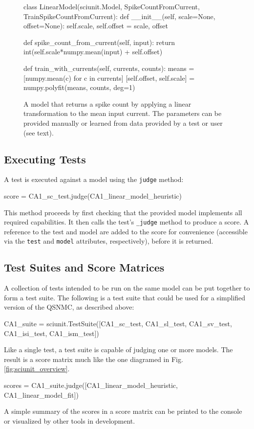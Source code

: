 \documentclass{frontiersSCNS}
\let\verbx\lstinline
\begin{document}
\begin{figure}
\begin{python}
class LinearModel(sciunit.Model, SpikeCountFromCurrent, 
    TrainSpikeCountFromCurrent):
  def __init__(self, scale=None, offset=None): 
    self.scale, self.offset = scale, offset
    
  def spike_count_from_current(self, input):
    return int(self.scale*numpy.mean(input) + self.offset)

  def train_with_currents(self, currents, counts):
    means = [numpy.mean(c) for c in currents]
    [self.offset, self.scale] = numpy.polyfit(means, counts, deg=1)    
\end{python}
\vspace{-15px}
\caption{A model that returns a spike count by applying a linear transformation to the mean input current. The parameters can be provided manually or learned from data provided by a test or user (see text).}
\label{fig:simple_model}
\vspace{-10px}
\end{figure}

\subsection{Executing Tests} A test is executed against a model using the \verbx{judge} method:
\begin{python}
score = CA1_sc_test.judge(CA1_linear_model_heuristic)
\end{python}

This method proceeds by first checking that the provided model implements all required capabilities. It then calls the test's \verbx{_judge} method to produce a score. A reference to the test and model are added to the score for convenience (accessible via the \verbx{test} and \verbx{model} attributes, respectively), before it is returned.

\subsection{Test Suites and Score Matrices} A collection of tests intended to be run on the same model can be put together to form a test suite.
The following is a test suite that could be used for a simplified version of the QSNMC, as described above:  
\begin{python}
CA1_suite = sciunit.TestSuite([CA1_sc_test, CA1_sl_test, CA1_sv_test, CA1_isi_test, CA1_ism_test])
\end{python}
Like a single test, a test suite is capable of judging one or more models. The result is a score matrix much like the one diagramed in Fig. \ref{fig:sciunit_overview}.
\begin{python}
scores = CA1_suite.judge([CA1_linear_model_heuristic, CA1_linear_model_fit])
\end{python}
A simple summary of the scores in a score matrix can be printed to the console or visualized by other tools in development.
\end{document}

